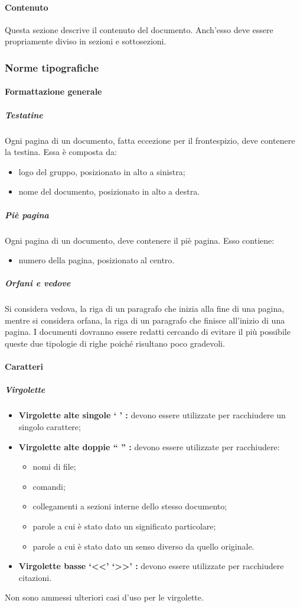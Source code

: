 \documentclass[../NormeProgetto.tex]{subfiles}
\begin{document}
		\paragraph{Contenuto}
			Questa sezione descrive il contenuto del documento. Anch'esso deve essere propriamente diviso in sezioni e sottosezioni.
	
	\subsubsection{Norme tipografiche} \label{sec:Norme tipografiche}
		\paragraph{Formattazione generale}
			\subparagraph{Testatine}
				Ogni pagina di un documento, fatta eccezione per il frontespizio, deve contenere la testina. Essa è composta da:
				\begin{itemize}
					\item logo del gruppo, posizionato in alto a sinistra;
					\item nome del documento, posizionato in alto a destra.
				\end{itemize}
			\subparagraph{Piè pagina}
				Ogni pagina di un documento, deve contenere il piè pagina. Esso contiene:
				\begin{itemize}
					\item numero della pagina, posizionato al centro.
				\end{itemize}
			\subparagraph{Orfani e vedove}
				Si considera vedova, la riga di un paragrafo che inizia alla fine di una pagina, mentre si considera orfana, la riga di un paragrafo che finisce all'inizio di una pagina. I documenti dovranno essere redatti cercando di evitare il più possibile queste due tipologie di righe poiché risultano poco gradevoli. 
		\paragraph{Caratteri}
			
			\subparagraph{Virgolette}
				\begin{itemize}
					\item \textbf{Virgolette alte singole ` ' :} devono essere utilizzate per racchiudere un singolo carattere;
					\item \textbf{Virgolette alte doppie `` '' :} devono essere utilizzate per racchiudere:
					\begin{itemize}
						\item nomi di file;
						\item comandi;
						\item collegamenti a sezioni interne dello stesso documento;
						\item parole a cui è stato dato un significato particolare;
						\item parole a cui è stato dato un senso diverso da quello originale.
					\end{itemize}
					\item \textbf{Virgolette basse `<<' `>>' :} devono essere utilizzate per racchiudere citazioni.
				\end{itemize}
				Non sono ammessi ulteriori casi d'uso per le virgolette.
			
\end{document}
